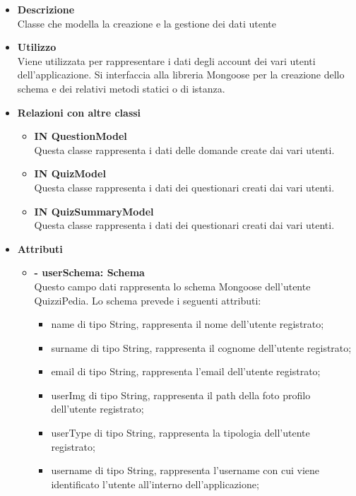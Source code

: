 \begin{itemize}
	\item \textbf{Descrizione} \\
	Classe che modella la creazione e la gestione dei dati utente
	\item \textbf{Utilizzo} \\
	Viene utilizzata per rappresentare i dati degli account dei vari utenti dell’applicazione. Si interfaccia alla libreria Mongoose per la creazione dello schema e dei relativi metodi statici o di istanza.
	\item \textbf{Relazioni con altre classi} \\
		\begin{itemize}
			\item \textbf{IN QuestionModel} \\
			Questa classe rappresenta i dati delle domande create dai vari utenti.
			\item \textbf{IN QuizModel} \\
			Questa classe rappresenta i dati dei questionari creati dai vari utenti.
			\item \textbf{IN QuizSummaryModel} \\
			Questa classe rappresenta i dati dei questionari creati dai vari utenti.
		\end{itemize}
	\item \textbf{Attributi} \\
		\begin{itemize}
			\item \textbf{- userSchema: Schema} \\
			Questo campo dati rappresenta lo schema Mongoose dell'utente QuizziPedia. Lo schema prevede i seguenti attributi:
			\begin{itemize}
				\item 
					name di tipo String, rappresenta il nome  dell'utente registrato;
				\item 
					surname di tipo String, rappresenta il cognome  dell'utente registrato;
				\item 
					email di tipo String, rappresenta l'email  dell'utente registrato;
				\item 
					userImg di tipo String, rappresenta il path della foto profilo dell'utente registrato;
				\item 
					userType di tipo String, rappresenta la tipologia dell'utente registrato;
				\item 
					username di tipo String, rappresenta l'username con cui viene identificato l'utente all'interno dell'applicazione;		

\end{itemize}
\end{itemize}
\end{itemize}
